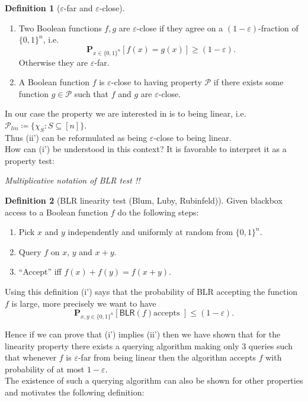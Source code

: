 \documentclass[a4paper]{article}
\newcommand{\prob}{\mathbf{P}}
\newcommand{\prty}{\mathcal{P}}
\newcommand{\nset}{[n]}
\newcommand{\eps}{\varepsilon}
\theoremstyle{plain}
\theoremstyle{definition}
\newtheorem{definition}{Definition}
\theoremstyle{remark}
\begin{document}
\begin{definition}[\(\eps\)-far and \(\eps\)-close]
  \begin{enumerate}[label=(\roman*)]
  \item Two Boolean functions \(f,g\) are \(\eps\)-close if they agree
    on a \((1-\eps)\)-fraction of \(\{0,1\}^n\), i.e. 
    \[\prob_{x\in\{0,1\}^n}\left[f(x) = g(x)\right] \geq (1-\eps).\]
    Otherwise they are \(\eps\)-far. 
  \item A Boolean function \(f\) is \(\eps\)-close to having property
    \(\prty\) if there exists some function \(g\in \prty\) such that
    \(f\) and \(g\) are \(\eps\)-close. 
  \end{enumerate}
\end{definition}

\noindent In our case the property we are interested in is to being
linear, i.e. \(\prty_{lin} \coloneqq \{\chi_S: S \subseteq
\nset\}\). \\ 
Thus (ii') can be reformulated as being \(\eps\)-close to being
linear. \\

How can (i') be understood in this context? It is favorable to
interpret it as a property test: 

\emph{Multiplicative notation of BLR test !!}

\begin{definition}[\textsf{BLR} linearity test (Blum, Luby, Rubinfeld)]
  Given blackbox access to a Boolean function \(f\) do the following
  steps: 
  \begin{enumerate}
  \item Pick \(x\) and \(y\) independently and uniformly at random
    from \(\{0,1\}^n\).
  \item Query \(f\) on \(x\), \(y\) and \(x+y\).
  \item ``Accept'' iff \(f(x) + f(y) = f(x+y)\). 
  \end{enumerate}
\end{definition}

\noindent Using this definition (i') says that the probability of
\textsf{BLR} accepting the function \(f\) is large, more precisely we
want to have \[\prob_{x,y \in \{0,1\}^n}\left[\textsf{BLR}(f) \text{
    accepts }\right] \leq (1-\eps).\]

\noindent Hence if we can prove that (i') implies (ii') then we have
shown that for the linearity property there exists a querying
algorithm making only \(3\) queries such that whenever \(f\) is
\(\eps\)-far from being linear then the algorithm accepts \(f\) with
probability of at most \(1-\eps\). \\
The existence of such a querying algorithm can also be shown for other
properties and motivates the following definition: 
\end{document}
